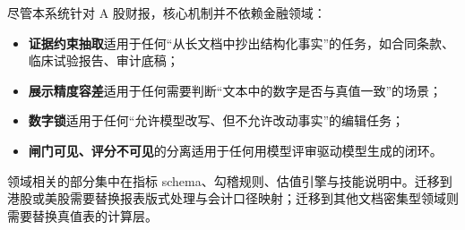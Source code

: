 尽管本系统针对 A 股财报，核心机制并不依赖金融领域：
\begin{itemize}
  \item \textbf{证据约束抽取}适用于任何“从长文档中抄出结构化事实”的任务，如合同条款、临床试验报告、审计底稿；
  \item \textbf{展示精度容差}适用于任何需要判断“文本中的数字是否与真值一致”的场景；
  \item \textbf{数字锁}适用于任何“允许模型改写、但不允许改动事实”的编辑任务；
  \item \textbf{闸门可见、评分不可见}的分离适用于任何用模型评审驱动模型生成的闭环。
\end{itemize}
领域相关的部分集中在指标 schema、勾稽规则、估值引擎与技能说明中。迁移到港股或美股需要替换报表版式处理与会计口径映射；迁移到其他文档密集型领域则需要替换真值表的计算层。
